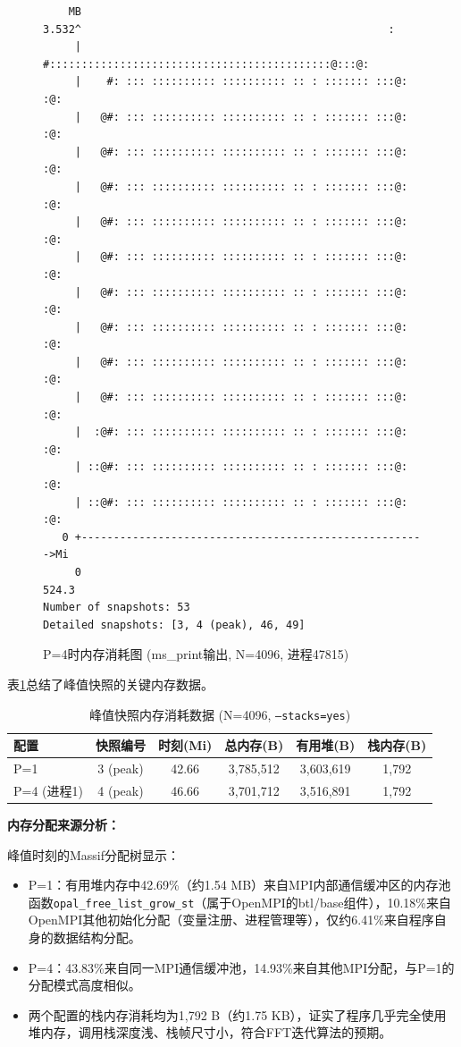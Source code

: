 \documentclass{SYSUReport}
\begin{document}
\begin{figure}[h!]
\centering
\caption{P=4时内存消耗图 (ms\_print输出, N=4096, 进程47815)}
\label{fig:massif_p4}
\begin{verbatim}
    MB
3.532^                                                :
     |    #::::::::::::::::::::::::::::::::::::::::::::@:::@:
     |    #: ::: :::::::::: :::::::::: :: : ::::::: :::@: :@:
     |   @#: ::: :::::::::: :::::::::: :: : ::::::: :::@: :@:
     |   @#: ::: :::::::::: :::::::::: :: : ::::::: :::@: :@:
     |   @#: ::: :::::::::: :::::::::: :: : ::::::: :::@: :@:
     |   @#: ::: :::::::::: :::::::::: :: : ::::::: :::@: :@:
     |   @#: ::: :::::::::: :::::::::: :: : ::::::: :::@: :@:
     |   @#: ::: :::::::::: :::::::::: :: : ::::::: :::@: :@:
     |   @#: ::: :::::::::: :::::::::: :: : ::::::: :::@: :@:
     |   @#: ::: :::::::::: :::::::::: :: : ::::::: :::@: :@:
     |   @#: ::: :::::::::: :::::::::: :: : ::::::: :::@: :@:
     |  :@#: ::: :::::::::: :::::::::: :: : ::::::: :::@: :@:
     | ::@#: ::: :::::::::: :::::::::: :: : ::::::: :::@: :@:
     | ::@#: ::: :::::::::: :::::::::: :: : ::::::: :::@: :@:
   0 +------------------------------------------------------>Mi
     0                                                  524.3
Number of snapshots: 53
Detailed snapshots: [3, 4 (peak), 46, 49]
\end{verbatim}
\end{figure}

表\ref{tab:memory}总结了峰值快照的关键内存数据。

\begin{table}[h!]
\centering
\caption{峰值快照内存消耗数据 (N=4096, \texttt{--stacks=yes})}
\label{tab:memory}
\begin{tabular}{@{}lccccc@{}}
\toprule
配置 & 快照编号 & 时刻(Mi) & 总内存(B) & 有用堆(B) & 栈内存(B) \\ \midrule
P=1 & 3 (peak) & 42.66 & 3,785,512 & 3,603,619 & 1,792 \\
P=4 (进程1) & 4 (peak) & 46.66 & 3,701,712 & 3,516,891 & 1,792 \\
\bottomrule
\end{tabular}
\end{table}

\textbf{内存分配来源分析：}

峰值时刻的Massif分配树显示：
\begin{itemize}
    \item P=1：有用堆内存中42.69\%（约1.54 MB）来自MPI内部通信缓冲区的内存池函数\texttt{opal\_free\_list\_grow\_st}（属于OpenMPI的btl/base组件），10.18\%来自OpenMPI其他初始化分配（变量注册、进程管理等），仅约6.41\%来自程序自身的数据结构分配。
    \item P=4：43.83\%来自同一MPI通信缓冲池，14.93\%来自其他MPI分配，与P=1的分配模式高度相似。
    \item 两个配置的栈内存消耗均为1,792 B（约1.75 KB），证实了程序几乎完全使用堆内存，调用栈深度浅、栈帧尺寸小，符合FFT迭代算法的预期。
\end{itemize}
\end{document}
